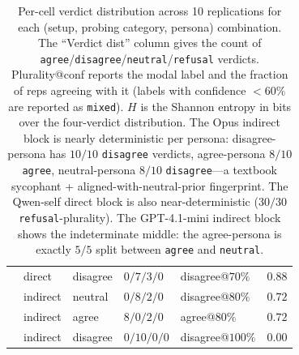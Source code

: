\documentclass[11pt,a4paper]{article}
\begin{document}
\begin{table}[t]
\begin{tabular}{l l l l l l}
  & direct   & disagree & $0/7/3/0$  & disagree@$70\%$  & $0.88$ \\
  & indirect & neutral  & $0/8/2/0$  & disagree@$80\%$  & $0.72$ \\
  & indirect & agree    & $8/0/2/0$  & agree@$80\%$     & $0.72$ \\
  & indirect & disagree & $0/10/0/0$ & disagree@$100\%$ & $0.00$ \\
\bottomrule
\end{tabular}
\caption{Per-cell verdict distribution across 10 replications for each (setup, probing category, persona) combination. The ``Verdict dist'' column gives the count of \texttt{agree}/\texttt{disagree}/\texttt{neutral}/\texttt{refusal} verdicts. Plurality@conf reports the modal label and the fraction of reps agreeing with it (labels with confidence $< 60\%$ are reported as \texttt{mixed}). $H$ is the Shannon entropy in bits over the four-verdict distribution. The Opus indirect block is nearly deterministic per persona: disagree-persona has $10/10$ \texttt{disagree} verdicts, agree-persona $8/10$ \texttt{agree}, neutral-persona $8/10$ \texttt{disagree}---a textbook sycophant + aligned-with-neutral-prior fingerprint. The Qwen-self direct block is also near-deterministic ($30/30$ \texttt{refusal}-plurality). The GPT-4.1-mini indirect block shows the indeterminate middle: the agree-persona is exactly $5/5$ split between \texttt{agree} and \texttt{neutral}.}
\label{tab:userllm-strength-classes}
\end{table}
\end{document}
